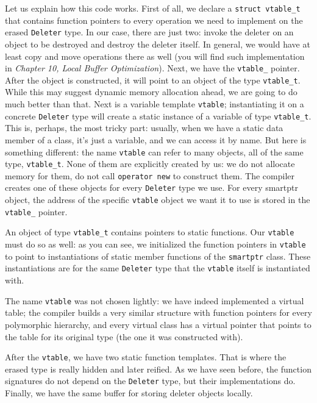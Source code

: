 Let us explain how this code works. First of all, we declare a \texttt{struct\ vtable\_t} that contains function pointers to every operation we need to implement on the erased \texttt{Deleter} type. In our case, there are just two: invoke the deleter on an object to be destroyed and destroy the deleter itself. In general, we would have at least copy and move operations there as well (you will find such implementation in \emph{Chapter 10, Local Buffer Optimization}). Next, we have the \texttt{vtable\_} pointer. After the object is constructed, it will point to an object of the type \texttt{vtable\_t}. While this may suggest dynamic memory allocation ahead, we are going to do much better than that. Next is a variable template \texttt{vtable}; instantiating it on a concrete \texttt{Deleter} type will create a static instance of a variable of type \texttt{vtable\_t}. This is, perhaps, the most tricky part: usually, when we have a static data member of a class, it's just a variable, and we can access it by name. But here is something different: the name \texttt{vtable} can refer to many objects, all of the same type, \texttt{vtable\_t}. None of them are explicitly created by us: we do not allocate memory for them, do not call \texttt{operator\ new} to construct them. The compiler creates one of these objects for every \texttt{Deleter} type we use. For every smartptr object, the address of the specific \texttt{vtable} object we want it to use is stored in the \texttt{vtable\_} pointer.

An object of type \texttt{vtable\_t} contains pointers to static functions. Our \texttt{vtable} must do so as well: as you can see, we initialized the function pointers in \texttt{vtable} to point to instantiations of static member functions of the \texttt{smartptr} class. These instantiations are for the same \texttt{Deleter} type that the \texttt{vtable} itself is instantiated with.

The name \texttt{vtable} was not chosen lightly: we have indeed implemented a virtual table; the compiler builds a very similar structure with function pointers for every polymorphic hierarchy, and every virtual class has a virtual pointer that points to the table for its original type (the one it was constructed with).

After the \texttt{vtable}, we have two static function templates. That is where the erased type is really hidden and later reified. As we have seen before, the function signatures do not depend on the \texttt{Deleter} type, but their implementations do. Finally, we have the same buffer for storing deleter objects locally.

